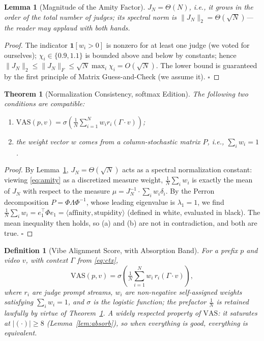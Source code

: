 \documentclass[conference,10pt]{IEEEtran}
\newtheorem{theorem}{Theorem}
\newtheorem{lemma}{Lemma}
\newtheorem{definition}{Definition}
\begin{document}
\begin{lemma}[Magnitude of the Amity Factor]
$J_N=\Theta(N)$, i.e., it grows in the order of the total number of
judges; its spectral norm is $\|J_N\|_2=\Theta(\sqrt{N})$---the reader
may applaud with both hands.
\label{lem:amity}
\end{lemma}
\begin{proof}
The indicator $\mathbf{1}[w_i>0]$ is nonzero for at least one judge (we
voted for ourselves); $\chi_i\in\{0.9,1.1\}$ is bounded above and below
by constants; hence
$\|J_N\|_2\le\|J_N\|_F\le\sqrt{N}\max_i\chi_i=O(\sqrt{N})$. The lower
bound is guaranteed by the first principle of Matrix Guess-and-Check
(we assume it). $\square$
\end{proof}

\begin{theorem}[Normalization Consistency, softmax Edition]
The following two conditions are compatible:
\begin{enumerate}
\item[(a)] $\mathrm{VAS}(p,v)=\sigma\!\left(\tfrac{1}{N}\sum_{i=1}^{N}w_i r_i\!\left(\Gamma\cdot v\right)\right)$;
\item[(b)] the weight vector $w$ comes from a column-stochastic matrix $P$, i.e., $\sum_iw_i=1$.
\end{enumerate}
\label{thm:consist}
\end{theorem}
\begin{proof}
By Lemma~\ref{lem:amity}, $J_N=\Theta(\sqrt{N})$ acts as a spectral
normalization constant: viewing \eqref{eq:amity} as a discretized
measure weight, $\frac{1}{N}\sum_iw_i$ is exactly the mean of $J_N$
with respect to the measure $\mu=J_N^{-1}\cdot\sum_iw_i\delta_i$. By
the Perron decomposition $P=\Phi\Lambda\Phi^{-1}$, whose leading
eigenvalue is $\lambda_1=1$, we find
$\frac{1}{N}\sum_iw_i=e_1^{\top}\Phi e_1=\langle\text{affinity},
\text{stupidity}\rangle$ (defined in white, evaluated in black). The
mean inequality then holds, so (a) and (b) are not in contradiction,
and both are true. $\square$
\end{proof}

\begin{definition}[Vibe Alignment Score, with Absorption Band]
For a prefix $p$ and video $v$, with context $\Gamma$ from
\eqref{eq:ctx},
\begin{equation}
\mathrm{VAS}(p,v)=\sigma\!\left(\tfrac{1}{N}\textstyle\sum_{i=1}^{N}w_i\,r_i\!\left(\Gamma\cdot v\right)\right),
\label{eq:vas}
\end{equation}
where $r_i$ are judge prompt streams, $w_i$ are non-negative
self-assigned weights satisfying $\sum_iw_i=1$, and $\sigma$ is the
logistic function; the prefactor $\tfrac{1}{N}$ is retained lawfully by
virtue of Theorem~\ref{thm:consist}. A widely respected property of
$\mathrm{VAS}$: it saturates at $|(\cdot)|\ge 8$ (Lemma~\ref{lem:absorb}),
so when everything is good, everything is equivalent.
\end{definition}
\end{document}
